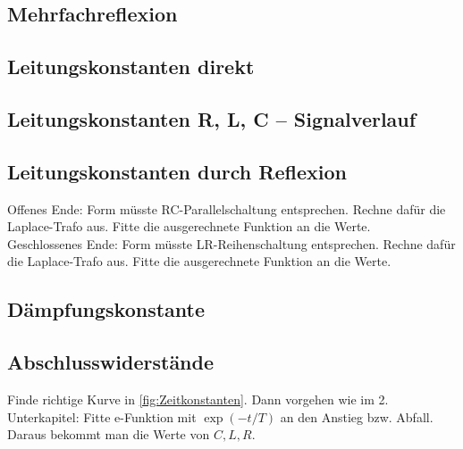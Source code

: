 \subsection{Mehrfachreflexion}
\clearpage
\subsection{Leitungskonstanten direkt}
\clearpage
\subsection{Leitungskonstanten R, L, C -- Signalverlauf}

\clearpage
\subsection{Leitungskonstanten durch Reflexion}
Offenes Ende: Form müsste RC-Parallelschaltung entsprechen. Rechne dafür die Laplace-Trafo aus. Fitte die ausgerechnete Funktion an die Werte. \\
Geschlossenes Ende: Form müsste LR-Reihenschaltung entsprechen. Rechne dafür die Laplace-Trafo aus. Fitte die ausgerechnete Funktion an die Werte.
\subsection{Dämpfungskonstante}

\subsection{Abschlusswiderstände}
Finde richtige Kurve in \ref{fig:Zeitkonstanten}. Dann vorgehen wie im 2. Unterkapitel: Fitte e-Funktion mit $\exp(-t/T)$ an den Anstieg bzw. Abfall. Daraus bekommt man die Werte von $C,L,R$.
\clearpage


